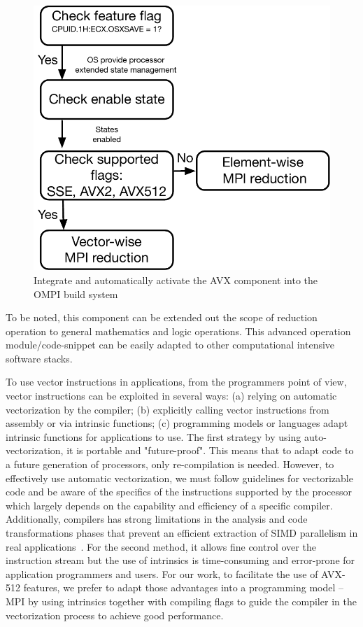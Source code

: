 \documentclass[sigconf,review]{acmart}
\begin{document}
\begin{figure}[h]
    \centering
    \includegraphics[scale=.45]{avx-graph.pdf}
    \caption{Integrate and automatically activate the AVX component into the OMPI build system}
    \label{fig:512flow}
\end{figure}

To be noted, this component can be
extended out the scope of reduction operation to general mathematics and logic operations.
This advanced operation module/code-snippet can be easily adapted to other computational intensive software stacks.

To use vector instructions in applications, from the programmers point of view,
vector instructions can be exploited in several ways: (a) relying on automatic vectorization by the
compiler; (b) explicitly calling vector
instructions from assembly or via intrinsic functions; (c) programming models or languages adapt
intrinsic functions for applications to use.
The first strategy by using auto-vectorization,
it is portable and "future-proof". This means that to adapt code to a future generation of processors, only re-compilation
is needed. However, to effectively use automatic vectorization, we must follow
guidelines for vectorizable code and be aware of the specifics of the instructions supported
by the processor which largely depends on the capability and efficiency of a specific compiler.
Additionally, compilers has strong limitations in the analysis and code transformations phases
that prevent an efficient extraction of SIMD parallelism in real applications~\cite{auto_Evaluation}.
For the second method, it allows fine control over the instruction stream but the use of
intrinsics is time-consuming and error-prone for application programmers and users.
For our work, to facilitate the use of AVX-512 features, we
prefer to adapt those advantages into a programming model --  MPI by using
intrinsics together with compiling flags
to guide the compiler in the vectorization process to achieve good performance.
\end{document}
